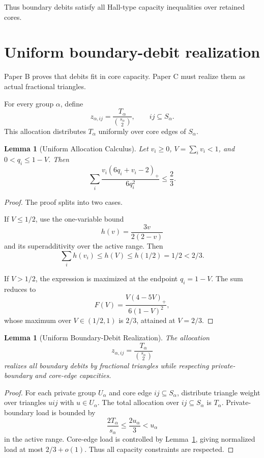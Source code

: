 \documentclass[11pt]{article}
\newtheorem{lemma}[theorem]{Lemma}
\theoremstyle{definition}
\begin{document}
Thus boundary debits satisfy all Hall-type capacity inequalities over retained cores.

\section{Uniform boundary-debit realization}

Paper B proves that debits fit in core capacity. Paper C must realize them as actual fractional triangles.

For every group \(\alpha\), define
\[
    z_{\alpha,ij}
    =
    \frac{T_\alpha}{\binom{s_\alpha}{2}},
    \qquad
    ij\subseteq S_\alpha.
\]
This allocation distributes \(T_\alpha\) uniformly over core edges of \(S_\alpha\).

\begin{lemma}[Uniform Allocation Calculus]\label{lem:uniform-calculus}
Let \(v_i\ge0\), \(V=\sum_i v_i<1\), and \(0<q_i\le1-V\). Then
\[
    \sum_i
    \frac{
    v_i(6q_i+v_i-2)_+
    }{6q_i^2}
    \le
    \frac23.
\]
\end{lemma}

\begin{proof}
The proof splits into two cases.

If \(V\le1/2\), use the one-variable bound
\[
    h(v)=\frac{3v}{2(2-v)}
\]
and its superadditivity over the active range. Then
\[
    \sum_i h(v_i)\le h(V)\le h(1/2)=1/2<2/3.
\]

If \(V>1/2\), the expression is maximized at the endpoint \(q_i=1-V\). The sum reduces to
\[
    F(V)=\frac{V(4-5V)_+}{6(1-V)^2},
\]
whose maximum over \(V\in(1/2,1)\) is \(2/3\), attained at \(V=2/3\).
\end{proof}

\begin{lemma}[Uniform Boundary-Debit Realization]\label{lem:uniform-realization}
The allocation
\[
    z_{\alpha,ij}
    =
    \frac{T_\alpha}{\binom{s_\alpha}{2}}
\]
realizes all boundary debits by fractional triangles while respecting private-boundary and core-edge capacities.
\end{lemma}

\begin{proof}
For each private group \(U_\alpha\) and core edge \(ij\subseteq S_\alpha\), distribute triangle weight over triangles \(uij\) with \(u\in U_\alpha\). The total allocation over \(ij\subseteq S_\alpha\) is \(T_\alpha\). Private-boundary load is bounded by
\[
    \frac{2T_\alpha}{s_\alpha}\le \frac{2u_\alpha}{3}<u_\alpha
\]
in the active range. Core-edge load is controlled by Lemma~\ref{lem:uniform-calculus}, giving normalized load at most \(2/3+o(1)\). Thus all capacity constraints are respected.
\end{proof}
\end{document}
